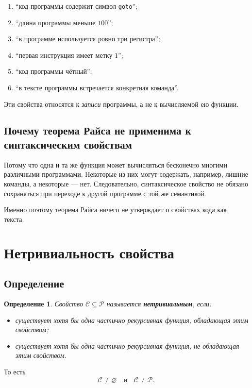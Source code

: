 \documentclass[12pt,a4paper]{article}
\newtheorem{definition}{Определение}
\begin{document}
\begin{enumerate}
    \item ``код программы содержит символ \texttt{goto}'';
    \item ``длина программы меньше $100$'';
    \item ``в программе используется ровно три регистра'';
    \item ``первая инструкция имеет метку $1$'';
    \item ``код программы чётный'';
    \item ``в тексте программы встречается конкретная команда''.
\end{enumerate}

Эти свойства относятся к \emph{записи} программы, а не к вычисляемой ею функции.

\subsection{Почему теорема Райса не применима к синтаксическим свойствам}
Потому что одна и та же функция может вычисляться бесконечно многими различными программами. Некоторые из них могут содержать, например, лишние команды, а некоторые --- нет. Следовательно, синтаксическое свойство не обязано сохраняться при переходе к другой программе с той же семантикой.

Именно поэтому теорема Райса ничего не утверждает о свойствах кода как текста.

\section{Нетривиальность свойства}

\subsection{Определение}
\begin{definition}
Свойство $\mathcal C\subseteq\mathcal P$ называется \textbf{нетривиальным}, если:
\begin{itemize}
    \item существует хотя бы одна частично рекурсивная функция, обладающая этим свойством;
    \item существует хотя бы одна частично рекурсивная функция, не обладающая этим свойством.
\end{itemize}
\end{definition}

То есть
$$
\mathcal C\neq\varnothing
\quad\text{и}\quad
\mathcal C\neq \mathcal P.
$$
\end{document}
